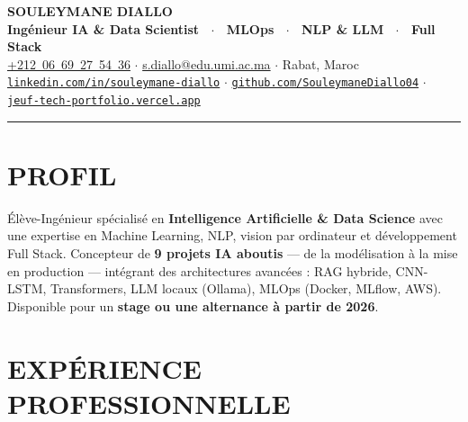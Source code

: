 \documentclass[10pt, a4paper]{article}
\begin{document}

\begin{center}
  {\LARGE\bfseries\color{accent} SOULEYMANE DIALLO}\\[5pt]
  {\normalsize\bfseries\color{muted}
    Ingénieur IA \& Data Scientist \ $\cdot$ \ MLOps \ $\cdot$ \ NLP \& LLM \ $\cdot$ \ Full Stack}\\[6pt]
  \small
  \href{tel:+212669275436}{+212\ 06\ 69\ 27\ 54\ 36}
  \enspace$\cdot$\enspace
  \href{mailto:s.diallo@edu.umi.ac.ma}{s.diallo@edu.umi.ac.ma}
  \enspace$\cdot$\enspace
  Rabat, Maroc\\[3pt]
  \href{https://www.linkedin.com/in/souleymane-diallo-51214728b/}{\texttt{linkedin.com/in/souleymane-diallo}}
  \enspace$\cdot$\enspace
  \href{https://github.com/SouleymaneDiallo04}{\texttt{github.com/SouleymaneDiallo04}}
  \enspace$\cdot$\enspace
  \href{https://jeuf-tech-portfolio.vercel.app/}{\texttt{jeuf-tech-portfolio.vercel.app}}
\end{center}

\vspace{-2pt}
\noindent\color{accent}\rule{\linewidth}{1pt}
\vspace{2pt}

\section{PROFIL}

Élève-Ingénieur spécialisé en \textbf{Intelligence Artificielle \& Data Science} avec une expertise en Machine Learning, NLP, vision par ordinateur et développement Full Stack.
Concepteur de \textbf{9 projets IA aboutis} — de la modélisation à la mise en production — intégrant des architectures avancées : RAG hybride, CNN-LSTM, Transformers, LLM locaux (Ollama), MLOps (Docker, MLflow, AWS).
Disponible pour un \textbf{stage ou une alternance à partir de 2026}.

\section{EXPÉRIENCE PROFESSIONNELLE}
\end{document}

